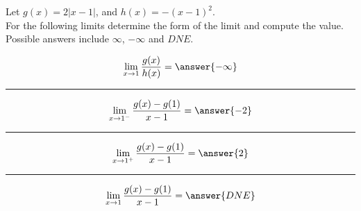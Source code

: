 \documentclass{ximera}
\author{Nela Lakos \and Kyle Parsons}
\begin{document}
\begin{exercise}

Let $g(x) = 2\left|x-1\right|$, and $h(x) = -(x-1)^2$.\\

For the following limits determine the form of the limit and compute the value.  Possible answers include $\infty$, $-\infty$ and $DNE$.

\[
\lim_{x\to1}\frac{g(x)}{h(x)} = \answer{-\infty}
\]

\begin{multipleChoice}
\end{multipleChoice}

\noindent\rule[0.5ex]{\linewidth}{0.2pt}

\[
\lim_{x\to1^-}\frac{g(x)-g(1)}{x-1} = \answer{-2}
\]

\begin{multipleChoice}
\end{multipleChoice}

\noindent\rule[0.5ex]{\linewidth}{0.2pt}

\[
\lim_{x\to1^+}\frac{g(x)-g(1)}{x-1} = \answer{2}
\]

\begin{multipleChoice}
\end{multipleChoice}

\noindent\rule[0.5ex]{\linewidth}{0.2pt}

\[
\lim_{x\to1}\frac{g(x)-g(1)}{x-1} = \answer{DNE}
\]

\begin{multipleChoice}
\end{multipleChoice}


\end{exercise}
\end{document}

